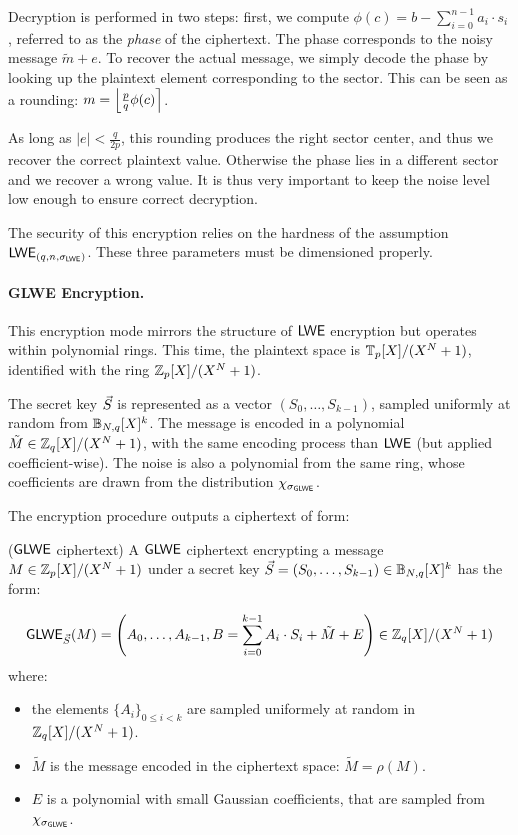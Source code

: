 Decryption is performed in two steps: first, we compute $\phi(c) = b - \sum_{i=0}^{n - 1} a_i \cdot s_i$, referred to as the \emph{phase} of the ciphertext. The phase corresponds to the noisy message $\tilde{m} + e$. To recover the actual message, we simply decode the phase by looking up the plaintext element corresponding to the sector. This can be seen as a rounding: $m = \left \lfloor \frac p q \phi(c) \right \rceil$. 

As long as $|e| < \frac{q}{2p}$, this rounding produces the right sector center, and thus we recover the correct plaintext value. Otherwise the phase lies in a different sector and we recover a wrong value. It is thus very important to keep the noise level low enough to ensure correct decryption.


The security of this encryption relies on the hardness of the assumption $\textsf{LWE}_{(q, n, \sigma_{\textsf{LWE}})}$. These three parameters must be dimensioned properly.



\paragraph{GLWE Encryption.} This encryption mode mirrors the structure of $\textsf{LWE}$ encryption but operates within polynomial rings.
This time, the plaintext space is $\mathbb{T}_p[X] / (X^N + 1)$, identified with the ring $\mathbb{Z}_p[X] / (X^N + 1)$.

The secret key $\vec S$ is represented as a vector $(S_0, \dots, S_{k-1})$, sampled uniformly at random from $\mathbb{B}_{N, q}[X]^k$. 
%
The message is encoded in a polynomial $\tilde M \in \mathbb{Z}_q[X] / (X^N + 1)$, with the same encoding process than $\textsf{LWE}$ (but applied coefficient-wise). The noise is also a polynomial from the same ring, whose coefficients are drawn from the distribution $\chi_{\sigma_{\textsf{GLWE}}}$.
%

The encryption procedure outputs a ciphertext of form:


\begin{definition}($\textsf{GLWE}$ ciphertext)
	A $\textsf{GLWE}$ ciphertext encrypting a message $M \in \mathbb{Z}_p[X] / (X^N + 1)$ under a secret key $\vec S = (S_0, \dots, S_{k-1}) \in \mathbb{B}_{N, q}[X]^k$ has the form:
	
	\begin{equation*}
		\textsf{GLWE}_{\vec S}(M) = \left ( A_0, \dots, A_{k-1}, B = \sum_{i=0}^{k-1} A_i \cdot S_i + \tilde M + E \right ) \in \mathbb{Z}_q[X] / (X^N + 1)
	\end{equation*}
	where:
	\begin{itemize}
		\item the elements $\{A_i\}_{0 \le i < k}$ are sampled uniformely at random in $\mathbb{Z}_q[X] / (X^N + 1)$.
		\item $\tilde M$ is the message encoded in the ciphertext space: $\tilde M = \rho(M)$.
		\item $E$ is a polynomial with small Gaussian coefficients, that are sampled from $\chi_{\sigma_{\textsf{GLWE}}}$.
	\end{itemize}
\end{definition}



